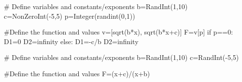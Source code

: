 \begin{sagesilent}
# Define variables and constants/exponents
b=RandInt(1,10)
c=NonZeroInt(-5,5)
p=Integer(randint(0,1))

#Define the function and values
v=[sqrt(b*x), sqrt(b*x+c)]
F=v[p]
if p==0:
   D1=0
   D2=infinity
else:
   D1=-c/b
   D2=infinity   
\end{sagesilent}
 

\begin{sagesilent}
# Define variables and constants/exponents
b=RandInt(1,10)
c=RandInt(-5,5)

#Define the function and values
F=(x+c)/(x+b)
\end{sagesilent}
 

% 
%
%
%
%

